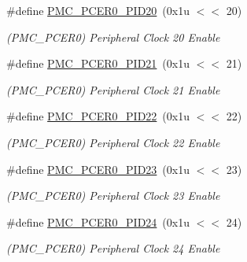 \begin{DoxyCompactItemize}
\mbox{\label{group__SAMS70__PMC_gaa43417148b073c33fb18fd616349c2b5}} 
\#define \mbox{\hyperlink{group__SAMS70__PMC_gaa43417148b073c33fb18fd616349c2b5}{P\+M\+C\+\_\+\+P\+C\+E\+R0\+\_\+\+P\+I\+D20}}~(0x1u $<$$<$ 20)
\begin{DoxyCompactList}\small\item\em (P\+M\+C\+\_\+\+P\+C\+E\+R0) Peripheral Clock 20 Enable \end{DoxyCompactList}\item 
\mbox{\label{group__SAMS70__PMC_ga9218ee3952c7faf08fcf57dcdb048dc4}} 
\#define \mbox{\hyperlink{group__SAMS70__PMC_ga9218ee3952c7faf08fcf57dcdb048dc4}{P\+M\+C\+\_\+\+P\+C\+E\+R0\+\_\+\+P\+I\+D21}}~(0x1u $<$$<$ 21)
\begin{DoxyCompactList}\small\item\em (P\+M\+C\+\_\+\+P\+C\+E\+R0) Peripheral Clock 21 Enable \end{DoxyCompactList}\item 
\mbox{\label{group__SAMS70__PMC_gadd9a53ca98b106c89b2030db798f552a}} 
\#define \mbox{\hyperlink{group__SAMS70__PMC_gadd9a53ca98b106c89b2030db798f552a}{P\+M\+C\+\_\+\+P\+C\+E\+R0\+\_\+\+P\+I\+D22}}~(0x1u $<$$<$ 22)
\begin{DoxyCompactList}\small\item\em (P\+M\+C\+\_\+\+P\+C\+E\+R0) Peripheral Clock 22 Enable \end{DoxyCompactList}\item 
\mbox{\label{group__SAMS70__PMC_ga6074e54836382f35b5c9395216721a99}} 
\#define \mbox{\hyperlink{group__SAMS70__PMC_ga6074e54836382f35b5c9395216721a99}{P\+M\+C\+\_\+\+P\+C\+E\+R0\+\_\+\+P\+I\+D23}}~(0x1u $<$$<$ 23)
\begin{DoxyCompactList}\small\item\em (P\+M\+C\+\_\+\+P\+C\+E\+R0) Peripheral Clock 23 Enable \end{DoxyCompactList}\item 
\mbox{\label{group__SAMS70__PMC_ga80fc1f134d2e50a72f6a57051916d292}} 
\#define \mbox{\hyperlink{group__SAMS70__PMC_ga80fc1f134d2e50a72f6a57051916d292}{P\+M\+C\+\_\+\+P\+C\+E\+R0\+\_\+\+P\+I\+D24}}~(0x1u $<$$<$ 24)
\begin{DoxyCompactList}\small\item\em (P\+M\+C\+\_\+\+P\+C\+E\+R0) Peripheral Clock 24 Enable \end{DoxyCompactList}\item 
$$
\end{DoxyCompactItemize}
